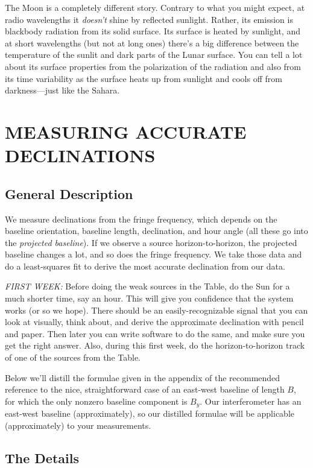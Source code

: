 \documentclass[11pt,preprint]{aastex}
\begin{document}
	The Moon is a completely different story. Contrary to what you
might expect, at radio wavelengths it {\it doesn't} shine by reflected
sunlight. Rather, its emission is blackbody radiation from its solid
surface. Its surface is heated by sunlight, and at short wavelengths
(but not at long ones) there's a big difference between the temperature
of the sunlit and dark parts of the Lunar surface. You can tell a lot
about its surface properties from the polarization of the radiation and
also from its time variability as the surface heats up from sunlight and
cools off from darkness---just like the Sahara.

\section {MEASURING ACCURATE DECLINATIONS} \label{declinations}

\subsection{General Description}

	We measure declinations from the fringe frequency, which depends
on the baseline orientation, baseline length, declination, and hour
angle (all these go into the {\it projected baseline}). If we observe a
source horizon-to-horizon, the projected baseline changes a lot, and so
does the fringe frequency. We take those data and do a least-squares
fit to derive the most accurate declination from our data.

	{\it FIRST WEEK:} Before doing the weak sources in the Table, do
the Sun for a much shorter time, say an hour. This will give you
confidence that the system works (or so we hope). There should be an
easily-recognizable signal that you can look at visually, think about,
and derive the approximate declination with pencil and paper. Then later
you can write software to do the same, and make sure you get the right
answer.  Also, during this first week, do the horizon-to-horizon track
of one of the sources from the Table.

	Below we'll distill the formulae given in the appendix of the
recommended reference to the nice, straightforward case of an east-west
baseline of length $B$, for which the only nonzero baseline component is
$B_y$. Our interferometer has an east-west baseline (approximately), so
our distilled formulae will be applicable (approximately) to your
measurements.

\subsection{The Details} \label{details}
\end{document}
